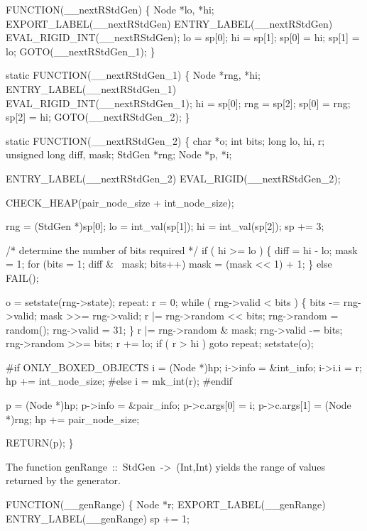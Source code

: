 FUNCTION(__nextRStdGen)
\{
    Node *lo, *hi;
    EXPORT_LABEL(__nextRStdGen)
 ENTRY_LABEL(__nextRStdGen)
    EVAL_RIGID_INT(__nextRStdGen);
    lo    = sp[0];
    hi    = sp[1];
    sp[0] = hi;
    sp[1] = lo;
    GOTO(__nextRStdGen_1);
\}

static
FUNCTION(__nextRStdGen_1)
\{
    Node *rng, *hi;
 ENTRY_LABEL(__nextRStdGen_1)
    EVAL_RIGID_INT(__nextRStdGen_1);
    hi    = sp[0];
    rng   = sp[2];
    sp[0] = rng;
    sp[2] = hi;
    GOTO(__nextRStdGen_2);
\}

static
FUNCTION(__nextRStdGen_2)
\{
    char   *o;
    int    bits;
    long   lo, hi, r;
    unsigned long diff, mask;
    StdGen *rng;
    Node   *p, *i;

 ENTRY_LABEL(__nextRStdGen_2)
    EVAL_RIGID(__nextRStdGen_2);

    CHECK_HEAP(pair_node_size + int_node_size);

    rng = (StdGen *)sp[0];
    lo  = int_val(sp[1]);
    hi  = int_val(sp[2]);
    sp += 3;

    /* determine the number of bits required */
    if ( hi >= lo )
    \{
        diff = hi - lo;
        mask = 1;
        for (bits = 1; diff & ~mask; bits++)
            mask = (mask << 1) + 1;
    \}
    else
        FAIL();

    o = setstate(rng->state);
repeat:
    r = 0;
    while ( rng->valid < bits )
    \{
        bits       -= rng->valid;
        mask      >>= rng->valid;
        r          |= rng->random << bits;
        rng->random = random();
        rng->valid  = 31;
    \}
    r            |= rng->random & mask;
    rng->valid   -= bits;
    rng->random >>= bits;
    r            += lo;
    if ( r > hi )
        goto repeat;
    setstate(o);

#if ONLY_BOXED_OBJECTS
    i       = (Node *)hp;
    i->info = &int_info;
    i->i.i  = r;
    hp     += int_node_size;
#else
    i = mk_int(r);
#endif

    p            = (Node *)hp;
    p->info      = &pair_info;
    p->c.args[0] = i;
    p->c.args[1] = (Node *)rng;
    hp          += pair_node_size;

    RETURN(p);
\}

\nwendcode{}\nwdocspar
The function {\Tt{}genRange\ ::\ StdGen\ ->\ (Int,Int)\nwendquote} yields the range of
values returned by the generator.

\nwenddocs{}\plusendmoddef\nwstartdeflinemarkup{}\nwenddeflinemarkup
FUNCTION(__genRange)
\{
    Node *r;
    EXPORT_LABEL(__genRange)
 ENTRY_LABEL(__genRange)
    sp          += 1;

